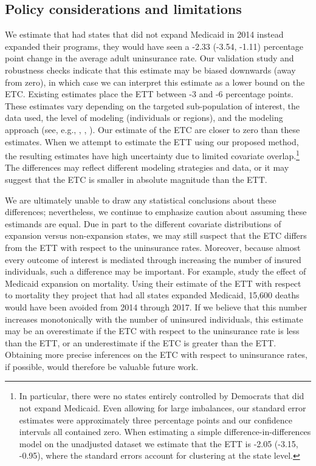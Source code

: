 \documentclass[aoas]{imsart}
\theoremstyle{plain}
\theoremstyle{remark}
\begin{document}
\subsection{Policy considerations and limitations}

We estimate that had states that did not expand Medicaid in 2014 instead expanded their programs, they would have seen a -2.33 (-3.54, -1.11) percentage point change in the average adult uninsurance rate. Our validation study and robustness checks indicate that this estimate may be biased downwards (away from zero), in which case we can interpret this estimate as a lower bound on the ETC. Existing estimates place the ETT between -3 and -6 percentage points. These estimates vary depending on the targeted sub-population of interest, the data used, the level of modeling (individuals or regions), and the modeling approach (see, e.g., \citet{courtemanche2017early}, \citet{kaestner2017effects}, \citet{frean2017premium}). Our estimate of the ETC are closer to zero than these estimates. When we attempt to estimate the ETT using our proposed method, the resulting estimates have high uncertainty due to limited covariate overlap.\footnote{In particular, there were no states entirely controlled by Democrats that did not expand Medicaid. Even allowing for large imbalances, our standard error estimates were approximately three percentage points and our confidence intervals all contained zero. When estimating a simple difference-in-differences model on the unadjusted dataset we estimate that the ETT is -2.05 (-3.15, -0.95), where the standard errors account for clustering at the state level.\label{footnote_did}} The differences may reflect different modeling strategies and data, or it may suggest that the ETC is smaller in absolute magnitude than the ETT.

We are ultimately unable to draw any statistical conclusions about these differences; nevertheless, we continue to emphasize caution about assuming these estimands are equal. Due in part to the different covariate distributions of expansion versus non-expansion states, we may still suspect that the ETC differs from the ETT with respect to the uninsurance rates. Moreover, because almost every outcome of interest is mediated through increasing the number of insured individuals, such a difference may be important. For example, \citet{miller2021medicaid} study the effect of Medicaid expansion on mortality. Using their estimate of the ETT with respect to mortality they project that had all states expanded Medicaid, 15,600 deaths would have been avoided from 2014 through 2017. If we believe that this number increases monotonically with the number of uninsured individuals, this estimate may be an overestimate if the ETC with respect to the uninsurance rate is less than the ETT, or an underestimate if the ETC is greater than the ETT. Obtaining more precise inferences on the ETC with respect to uninsurance rates, if possible, would therefore be valuable future work.
\end{document}
